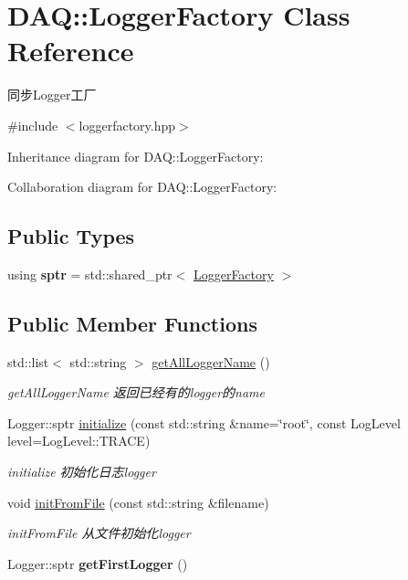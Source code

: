 \hypertarget{classDAQ_1_1LoggerFactory}{}\section{D\+AQ\+:\+:Logger\+Factory Class Reference}
\label{classDAQ_1_1LoggerFactory}


同步\+Logger工厂  




{\ttfamily \#include $<$loggerfactory.\+hpp$>$}



Inheritance diagram for D\+AQ\+:\+:Logger\+Factory\+:


Collaboration diagram for D\+AQ\+:\+:Logger\+Factory\+:
\subsection*{Public Types}
\begin{DoxyCompactItemize}
\item 
\mbox{\label{classDAQ_1_1LoggerFactory_a5fee167bc7e3025e6962234c30db2492}} 
using {\bfseries sptr} = std\+::shared\+\_\+ptr$<$ \hyperlink{classDAQ_1_1LoggerFactory}{Logger\+Factory} $>$
\end{DoxyCompactItemize}
\subsection*{Public Member Functions}
\begin{DoxyCompactItemize}
\item 
std\+::list$<$ std\+::string $>$ \hyperlink{classDAQ_1_1LoggerFactory_ae16677d1422753e2c4b51ea86d398737}{get\+All\+Logger\+Name} ()
\begin{DoxyCompactList}\small\item\em get\+All\+Logger\+Name 返回已经有的logger的name \end{DoxyCompactList}\item 
Logger\+::sptr \hyperlink{classDAQ_1_1LoggerFactory_a2504db6f7e1b8f5e8b1cbfa26cff81c5}{initialize} (const std\+::string \&name=\char`\"{}root\char`\"{}, const Log\+Level level=Log\+Level\+::\+T\+R\+A\+CE)
\begin{DoxyCompactList}\small\item\em initialize 初始化日志logger \end{DoxyCompactList}\item 
void \hyperlink{classDAQ_1_1LoggerFactory_a49615c743e047dfbc218bd5c272c0025}{init\+From\+File} (const std\+::string \&filename)
\begin{DoxyCompactList}\small\item\em init\+From\+File 从文件初始化logger \end{DoxyCompactList}\item 
\mbox{\label{classDAQ_1_1LoggerFactory_ab6b3047b202603a88d75a68a0076cd7a}} 
Logger\+::sptr {\bfseries get\+First\+Logger} ()
\end{DoxyCompactItemize}
